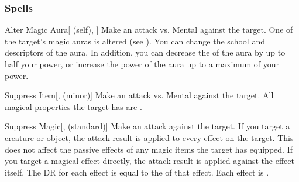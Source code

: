 \subsubsection{Spells}


\lowercase{\hypertarget{spell:Alter Magic Aura}{}}\label{spell:Alter Magic Aura}
\begin{attuneability}[Rank 1]{\hypertarget{spell:Alter Magic Aura}{Alter Magic Aura}}[ (self), ]
Make an attack vs. Mental against the target.
\hit One of the target's magic auras is altered (see ).
You can change the school and descriptors of the aura.
In addition, you can decrease the  of the aura by up to half your power, or increase the power of the aura up to a maximum of your power.
\end{attuneability}
\vspace{0.25em}



\lowercase{\hypertarget{spell:Suppress Item}{}}\label{spell:Suppress Item}
\begin{freeability}[Rank 1]{\hypertarget{spell:Suppress Item}{Suppress Item}}[,  (minor)]
Make an attack vs. Mental against the target.
\hit All magical properties the target has are .
\end{freeability}
\vspace{0.25em}



\lowercase{\hypertarget{spell:Suppress Magic}{}}\label{spell:Suppress Magic}
\begin{freeability}[Rank 1]{\hypertarget{spell:Suppress Magic}{Suppress Magic}}[,  (standard)]
Make an attack against the target.
If you target a creature or object, the attack result is applied to every  effect on the target.
This does not affect the passive effects of any magic items the target has equipped.
If you target a magical effect directly, the attack result is applied against the effect itself.
The DR for each effect is equal to the  of that effect.
\hit Each effect is .
\end{freeability}
\vspace{0.25em}




